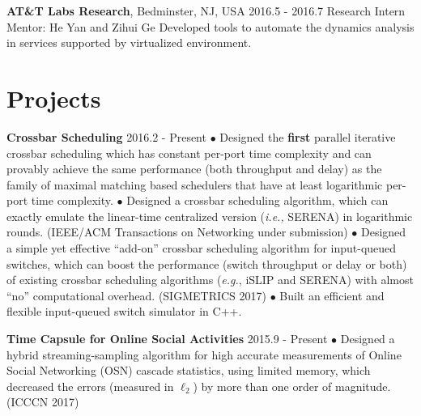 \documentclass[line,11pt,letter]{/home/saber/GitHub/personal-resume/includes/cls/myRes}
\begin{document}
\begin{resume}
{\setlength{\parskip}{0pt}
{\bf AT\&T Labs Research}, Bedminster, NJ, USA \hfill 2016.5 - 2016.7\break
{\hspace*{1em} Research Intern \hfill Mentor: He Yan and Zihui Ge\break}
{\hspace*{1em} Developed tools to automate the dynamics analysis in services supported by virtualized environment.\break}
}\negspace
\section{Projects}
\vspace{-4pt}
{\setlength{\parskip}{0pt}
{\bf Crossbar Scheduling} \hfill 2016.2 - Present\break
{\hspace*{1em} $\bullet$ Designed the {\bf first} parallel iterative crossbar scheduling which has constant per-port time complexity and can provably achieve the same performance (both throughput and delay) as the family of maximal matching based schedulers that have at least logarithmic per-port time complexity.\hfill\break}
{\hspace*{1em} $\bullet$ Designed a crossbar scheduling algorithm, which can exactly emulate the linear-time centralized version ({\it i.e.,} SERENA) in logarithmic rounds. (IEEE/ACM Transactions on Networking under submission)\hfill\break}
{\hspace*{1em} $\bullet$ Designed a simple yet effective ``add-on'' crossbar scheduling algorithm for input-queued switches, which can boost the performance (switch throughput or delay or both) of existing crossbar scheduling algorithms ({\it e.g.}, iSLIP and SERENA) with almost ``no'' computational overhead. (SIGMETRICS 2017)\hfill\break}
{\hspace*{1em} $\bullet$ Built an efficient and flexible input-queued switch simulator in C++.\hfill\break}
\sspace

}
{\setlength{\parskip}{0pt}
{\bf Time Capsule for Online Social Activities} \hfill 2015.9 - Present\break
{\hspace*{1em} $\bullet$ Designed a hybrid streaming-sampling algorithm for high accurate measurements of Online Social Networking (OSN) cascade statistics, using limited memory, which decreased the errors (measured in $\ell_2$) by more than one order of magnitude. (ICCCN 2017)\hfill\break}
\sspace

}
\end{resume}
\end{document}
